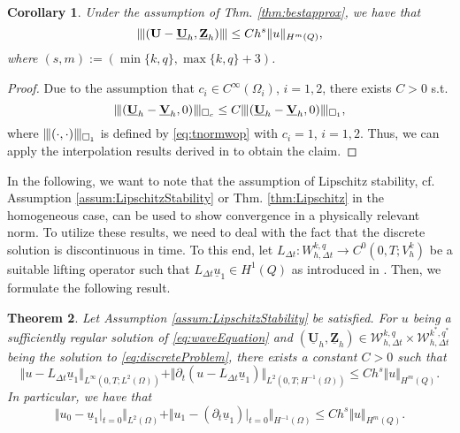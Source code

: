 \documentclass[sn-mathphys-num]{sn-jnl}
\newtheorem{thm}{Theorem}[section]
\newtheorem{cor}[thm]{Corollary}
\numberwithin{equation}{section}
\newcommand{\wop}{\square_c}
\newcommand{\tnorm}[1]{\vert\hspace{-0.3mm}\Vert#1\Vert\hspace{-0.3mm}\vert}
\newcommand{\FullyDiscrSpace}[2]{ W^{ {#1},{#2}}_{h, \Delta t  } }
\newcommand{\ProdFullyDiscrSpace}[2]{ \mathcal{W}^{ {#1},{#2}}_{h, \Delta t  } }
\newcommand{\Uh}{\underline{\mathbf{U}}_h}
\newcommand{\Vh}{\underline{\mathbf{V}}_h}
\newcommand{\Zh}{\underline{\mathbf{Z}}_h}
\newcommand{\ul}{\underline{u}}
\newcommand{\dt}{\partial_t}
\begin{document}
\begin{cor}\label{cor:tnormConvRates}
    Under the assumption of Thm. \ref{thm:bestapprox}, we have that
    \begin{equation*}
        \tnorm{(\mathbf{U} - \Uh,\Zh)} \le C h^s \Vert u \Vert_{H^m(Q)},
    \end{equation*}
    where $(s,m) := (\min\{ k,q \}, \max\{k,q\}+3)$. 
\end{cor}

\begin{proof}
    Due to the assumption that $c_i \in C^\infty(\Omega_i)$, $i = 1,2$, there exists $C > 0$ s.t.  
    \begin{equation*}
        \tnorm{(\Uh - \Vh, 0)}_{\wop} \le C \tnorm{(\Uh - \Vh, 0)}_{\square_1},
    \end{equation*}
    where $\tnorm{(\cdot, \cdot)}_{\square_1}$ is defined by \eqref{eq:tnormwop} with $c_i = 1$, $i = 1,2$. Thus, we can apply the interpolation results derived in \cite[Lem. 2.4]{BP24} to obtain the claim. 
\end{proof}


\noindent In the following, we want to note that the assumption of Lipschitz stability, cf. Assumption \ref{assum:LipschitzStability} or Thm. \ref{thm:Lipschitz} in the homogeneous case, can be used to show convergence in a physically relevant norm. To utilize these results, we need to deal with the fact that the discrete solution is discontinuous in time. To this end, let $L_{\Delta t} : \FullyDiscrSpace{k}{q} \rightarrow C^0(0,T;V_h^k)$ be a suitable lifting operator such that $L_{\Delta t} \ul_1 \in H^1(Q)$ as introduced in \cite[Sec. 4]{BP24}. Then, we formulate the following result.

\begin{thm}\label{thm:convergence}
    Let Assumption \ref{assum:LipschitzStability} be satisfied. For $u$ being a sufficiently regular solution of \eqref{eq:waveEquation} and $(\Uh,\Zh) \in \ProdFullyDiscrSpace{k}{q} \times \ProdFullyDiscrSpace{k^\ast}{q^\ast}$ being the solution to \eqref{eq:discreteProblem}, there exists a constant $C>0$ such that
    \begin{equation}
        \Vert u - L_{\Delta t} \ul_1 \Vert_{L^\infty(0,T;L^2(\Omega))} + \Vert \dt (u - L_{\Delta t} \ul_1) \Vert_{L^2(0,T;H^{-1}(\Omega))} \le C h^s \Vert u \Vert_{H^m(Q)}. 
    \end{equation}
    In particular, we have that 
    \begin{equation}
        \Vert u_0 - \ul_1 \vert_{t = 0} \Vert_{L^2(\Omega)} + \Vert u_1 - (\dt \ul_1) \vert_{t = 0} \Vert_{H^{-1}(\Omega)} \le C h^s \Vert u \Vert_{H^m(Q)}.
    \end{equation}
\end{thm}
\end{document}
